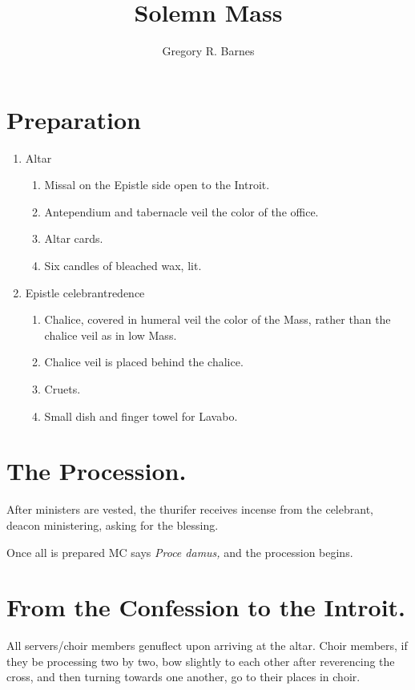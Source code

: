 \documentclass[letterpaper, twocolumn]{article}
\title{Solemn Mass}
\author{Gregory R. Barnes}
\begin{document}
	\maketitle

	\section{Preparation}

	\begin{enumerate}[label=\Roman*.]
		\item Altar
			\begin{enumerate}[label=\arabic*.]
				\item Missal on the Epistle side open to the Introit.
				\item Antependium and tabernacle veil the color of the office.
				\item Altar cards.
				\item Six candles of bleached wax, lit.
			\end{enumerate}
		\item Epistle celebrantredence
			\begin{enumerate}[label=\arabic*.]
				\item Chalice, covered in humeral veil the color of the Mass, rather than the chalice veil as in low Mass.
				\item Chalice veil is placed behind the chalice.
				\item Cruets.
				\item Small dish and finger towel for Lavabo.
			\end{enumerate}
	\end{enumerate}

	\section{The Procession.}

	\rubric After ministers are vested, the thurifer receives incense from the
	celebrant, deacon ministering, asking for the blessing.

	\rubric Once all is prepared MC says \textit{Proce damus,} and the
	procession begins.

	\section{From the Confession to the Introit.}

	\rubric All servers/choir members genuflect upon arriving at the altar.
	Choir members, if they be processing two by two, bow slightly to each other
	after reverencing the cross, and then turning towards one another, go to
	their places in choir.
\end{document}

